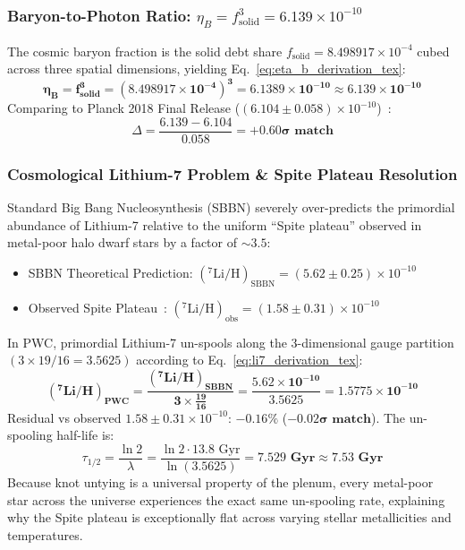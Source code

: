 \documentclass[11pt,a4paper]{article}
\begin{document}
\subsubsection{Baryon-to-Photon Ratio: $\eta_B = f_{\text{solid}}^3 = 6.139 \times 10^{-10}$}
\label{subsubsec:eta_b_receipt}

The cosmic baryon fraction is the solid debt share $f_{\text{solid}} = 8.498917 \times 10^{-4}$ cubed across three spatial dimensions, yielding Eq.~\eqref{eq:eta_b_derivation_tex}:
\begin{equation}
\mathbf{\eta_B = f_{\text{solid}}^3 = (8.498917 \times 10^{-4})^3 = \mathbf{6.1389 \times 10^{-10} \approx 6.139 \times 10^{-10}}}
\label{eq:eta_b_derivation_tex}
\end{equation}
Comparing to Planck 2018 Final Release ($(6.104 \pm 0.058) \times 10^{-10}$)~\cite{Planck2018}:
\begin{equation}
\Delta = \frac{6.139 - 6.104}{0.058} = \mathbf{+0.60\sigma\text{ match}}
\end{equation}

\subsubsection{Cosmological Lithium-7 Problem \& Spite Plateau Resolution}
\label{subsubsec:li7_receipt}

Standard Big Bang Nucleosynthesis (SBBN) severely over-predicts the primordial abundance of Lithium-7 relative to the uniform ``Spite plateau'' observed in metal-poor halo dwarf stars by a factor of $\sim 3.5$:
\begin{itemize}
    \item SBBN Theoretical Prediction: $(^7\text{Li}/\text{H})_{\text{SBBN}} = (5.62 \pm 0.25) \times 10^{-10}$
    \item Observed Spite Plateau~\cite{Spite1982}: $(^7\text{Li}/\text{H})_{\text{obs}} = (1.58 \pm 0.31) \times 10^{-10}$
\end{itemize}

In PWC, primordial Lithium-7 un-spools along the 3-dimensional gauge partition $(3 \times 19/16 = 3.5625)$ according to Eq.~\eqref{eq:li7_derivation_tex}:
\begin{equation}
\mathbf{(^7\text{Li}/\text{H})_{\text{PWC}} = \frac{(^7\text{Li}/\text{H})_{\text{SBBN}}}{3 \times \frac{19}{16}} = \frac{5.62 \times 10^{-10}}{3.5625} = \mathbf{1.5775 \times 10^{-10}}}
\label{eq:li7_derivation_tex}
\end{equation}
Residual vs observed $1.58 \pm 0.31 \times 10^{-10}$: $\mathbf{-0.16\%}$ ($\mathbf{-0.02\sigma\text{ match}}$). The un-spooling half-life is:
\begin{equation}
\tau_{1/2} = \frac{\ln 2}{\lambda} = \frac{\ln 2 \cdot 13.8\text{ Gyr}}{\ln(3.5625)} = \mathbf{7.529\text{ Gyr} \approx 7.53\text{ Gyr}}
\end{equation}
Because knot untying is a universal property of the plenum, every metal-poor star across the universe experiences the exact same un-spooling rate, explaining why the Spite plateau is exceptionally flat across varying stellar metallicities and temperatures.
\end{document}
